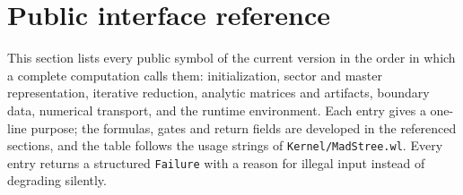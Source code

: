 \documentclass[11pt,a4paper]{article}
\begin{document}
\section{Public interface reference}
\label{sec:interface-reference}

This section lists every public symbol of the current version in the order in which a complete
computation calls them: initialization, sector and master representation,
iterative reduction, analytic matrices and artifacts, boundary data, numerical transport, and
the runtime environment. Each entry gives a one-line purpose; the formulas, gates and return
fields are developed in the referenced sections, and the table follows the usage strings of
\texttt{Kernel/MadStree.wl}. Every entry returns a structured \texttt{Failure} with a reason
for illegal input instead of degrading silently.
\end{document}

